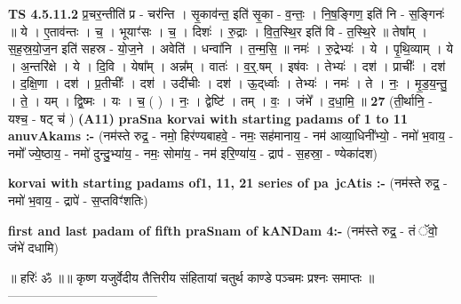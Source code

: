 \documentclass[17pt]{extarticle}
\begin{document}
                  \newline
                                \textbf{ TS 4.5.11.2} \newline
                  प्र॒चर॒न्तीति॑ प्र - चर॑न्ति । सृ॒काव॑न्त॒ इति॑ सृ॒का - व॒न्तः॒ । नि॒ष॒ङ्गिण॒ इति॑ नि - स॒ङ्गिनः॑ ॥ ये । ए॒ताव॑न्तः । च॒ । भूयाꣳ॑सः । च॒ । दिशः॑ । रु॒द्राः । वि॒त॒स्थि॒र इति॑ वि - त॒स्थि॒रे ॥ तेषा᳚म् । स॒ह॒स्र॒यो॒ज॒न इति॑ सहस्र - यो॒ज॒ने । अवेति॑ । धन्वा॑नि । त॒न्म॒सि॒ ॥ नमः॑ । रु॒द्रेभ्यः॑ । ये । पृ॒थि॒व्याम् । ये । अ॒न्तरि॑क्षे । ये । दि॒वि । येषा᳚म् । अन्न᳚म् । वातः॑ । व॒र्॒.षम् । इष॑वः । तेभ्यः॑ । दश॑ । प्राचीः᳚ । दश॑ । द॒क्षि॒णा । दश॑ । प्र॒तीचीः᳚ । दश॑ । उदी॑चीः । दश॑ । ऊ॒द्‌र्ध्वाः । तेभ्यः॑ । नमः॑ । ते । नः॒ । मृ॒ड॒य॒न्तु॒ । ते॒ । यम् । द्वि॒ष्मः । यः । च॒ ( ) । नः॒ । द्वेष्टि॑ । तम् । वः॒ । जंभे᳚ । द॒धा॒मि॒ ॥ \textbf{  27} \newline
                  \newline
                      (ती॒र्थानि॒ - यश्च॒ - षट् च॑ )  \textbf{(A11)} \newline \newline
\textbf{praSna korvai with starting padams of 1 to 11 anuvAkams :-} \newline
(नम॑स्ते रुद्र॒ - नमो॒ हिर॑ण्यबाहवे॒ - नमः॒ सह॑मानाय॒ - नम॑ आव्या॒धिनी᳚भ्यो॒ - नमो॑ भ॒वाय॒ - नमो᳚ ज्ये॒ष्ठाय॒ - नमो॑ दुन्दु॒भ्या॑य॒ - नमः॒ सोमा॑य॒ - नम॑ इरि॒ण्या॑य॒ - द्राप॑ - स॒हस्रा॒ - ण्येका॑दश) \newline

\textbf{korvai with starting padams of1, 11, 21 series of pa~jcAtis :-} \newline
(नम॑स्ते रुद्र॒ - नमो॑ भ॒वाय॒ - द्रापे॑ - स॒प्तविꣳ॑शतिः) \newline

\textbf{first and last padam of fifth praSnam of kANDam 4:-} \newline
(नम॑स्ते रुद्र॒ - तं ॅवो॒ जंभे॑ दधामि) \newline 


॥ हरिः॑ ॐ ॥॥ कृष्ण यजुर्वेदीय तैत्तिरीय संहितायां चतुर्थ काण्डे पञ्चमः प्रश्नः समाप्तः ॥
------------------------------------ \newline
\pagebreak
\pagebreak
        
\end{document}

